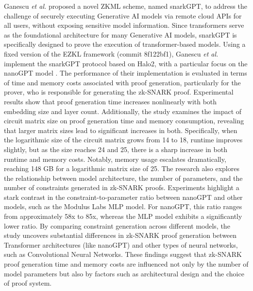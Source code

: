 \documentclass[journal]{IEEEtran}
\begin{document}
Ganescu \emph{et al.} \cite{ganescu2024trust} proposed a novel ZKML scheme, named  snarkGPT, to address the challenge of securely executing Generative AI models via remote cloud APIs for all users, without exposing sensitive model information. Since transformers serve as the foundational architecture for many Generative AI models, snarkGPT is specifically designed to prove the execution of transformer-based models. Using a fixed version of the EZKL framework (commit  8f122bf1), Ganescu \emph{et al.} implement the snarkGPT protocol based on Halo2, with a particular focus on the nanoGPT model \cite{karpathy2023nanogpt}. The performance of their implementation is evaluated in terms of time and memory costs associated with proof generation, particularly for the prover, who is responsible for generating the zk-SNARK proof. Experimental results show that proof generation time increases nonlinearly with both embedding size and layer count. Additionally, the study examines the impact of circuit matrix size on proof generation time and memory consumption, revealing that larger matrix sizes lead to significant increases in both. Specifically, when the logarithmic size of the circuit matrix grows from 14 to 18, runtime improves slightly, but as the size reaches 24 and 25, there is a sharp increase in both runtime and memory costs. Notably, memory usage escalates dramatically, reaching 148 GB for a logarithmic matrix size of 25. The research also explores the relationship between model architecture, the number of parameters, and the number of constraints generated in zk-SNARK proofs. Experiments highlight a stark contrast in the constraint-to-parameter ratio between nanoGPT and other models, such as the Modulus Labs MLP model. For nanoGPT, this ratio ranges from approximately 58x to 85x, whereas the MLP model exhibits a significantly lower ratio. By comparing constraint generation across different models, the study uncovers substantial differences in zk-SNARK proof generation between Transformer architectures (like nanoGPT) and other types of neural networks, such as Convolutional Neural Networks. These findings suggest that zk-SNARK proof generation time and memory costs are influenced not only by the number of model parameters but also by factors such as architectural design and the choice of proof system.
\end{document}
